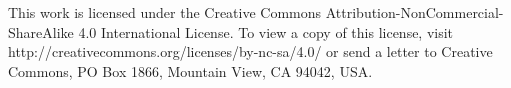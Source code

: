 \begin{center}
    \noindent This work is licensed under the Creative Commons Attribution-NonCommercial-ShareAlike
4.0 International License. To view a copy of this license, visit
http://creativecommons.org/licenses/by-nc-sa/4.0/ or send a letter to Creative Commons, PO
Box 1866, Mountain View, CA 94042, USA.
\end{center}
